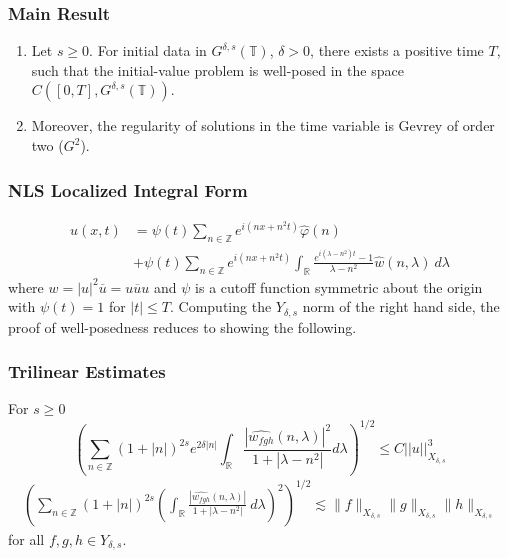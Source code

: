 \documentclass{beamer}
\numberwithin{equation}{section}
\newcommand{\rr}{\mathbb{R}}
\newcommand{\zz}{\mathbb{Z}}
\newcommand{\wh}{\widehat}
\begin{document}
\begin{frame}
  \frametitle{Main Result}
%
\begin{theorem}
  \begin{enumerate}
%
\item
Let $s\ge 0$. For initial data in $G^{\delta,s}(\mathbb{T})$, $\delta >0$,
there exists a positive time $T$, such that the initial-value problem
is well-posed in the space $C([0,T], G^{\delta,s}(\mathbb{T}))$.
%
\item
Moreover, the regularity of solutions in the time variable is Gevrey of order
two ($G^2$).
\end{enumerate}
%
\end{theorem}
\end{frame}
%
\begin{frame}
  \frametitle{NLS Localized Integral Form}
\begin{equation*}
  \begin{split}
u(x,t) & =
 \psi(t) \underset{n\in \mathbb{Z}}{\sum} e^{i(nx +n^2t)}  \widehat{\varphi} (n)
\\
& + \psi(t) \underset{n\in \mathbb{Z}}{\sum} e^{i(nx+n^2t)}  \int_{\mathbb{R}}
\frac{e^{i(\lambda-n^2 )t}-1}{\lambda-n^2}
\widehat{w}(n,\lambda) \ d \lambda
\end{split}
\end{equation*}
where $w=|u|^2\overline{u}=u\overline{u}u$ and 
$\psi$ is a cutoff function symmetric about the origin with
$\psi(t)=1$ for $| t | \le T$. Computing the $Y_{\delta, s}$ norm of the right
hand side, the proof of well-posedness reduces to showing the following.
\end{frame}
\begin{frame}
  \frametitle{Trilinear Estimates}
\begin{lemma}\label{bilinear1}
 For $s\ge 0$  
$$\left ( \sum_{n \in {\mathbb{Z}}} (1+|n|)^{2s}e^{2\delta |n|}
\int_{\mathbb{R}}
\frac{|\widehat{w_{fgh}}(n, \lambda)|^2}{1+|\lambda -n^2|}
d\lambda
\right )^{1/2}\le C||u||^3_{{X}_{\delta,s}}$$
%
%
\begin{equation*}
	\begin{split}
		\left( \sum_{n \in \zz} \left (1 + |n| \right )^{2s}  \left ( \int_\rr 
		\frac{|\wh{w_{fgh}}(n, \lambda) |}{1 + | \lambda - n^{2} |}
		 \ d\lambda \right)^2  \right)^{1/2} \lesssim \|f\|_{X_{\delta, s}} \|g\|_{X_{\delta, s}}\|h\|_{X_{\delta, s}}
	\end{split}
\end{equation*}
for all $f, g, h \in Y_{\delta,s}$.
\end{lemma}
\end{frame}
\end{document}
